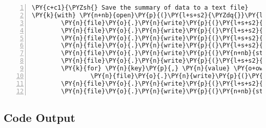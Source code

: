 \documentclass[12pt]{article}
\begin{document}
\begin{Verbatim}[commandchars=\\\{\},numbers=left,firstnumber=1,stepnumber=1,formatcom=\footnotesize]
\PY{c+c1}{\PYZsh{} Save the summary of data to a text file}
\PY{k}{with} \PY{n+nb}{open}\PY{p}{(}\PY{l+s+s2}{\PYZdq{}}\PY{l+s+s2}{data\PYZus{}exploration.txt}\PY{l+s+s2}{\PYZdq{}}\PY{p}{,} \PY{l+s+s2}{\PYZdq{}}\PY{l+s+s2}{w}\PY{l+s+s2}{\PYZdq{}}\PY{p}{)} \PY{k}{as} \PY{n}{file}\PY{p}{:}
        \PY{n}{file}\PY{o}{.}\PY{n}{write}\PY{p}{(}\PY{l+s+s2}{\PYZdq{}}\PY{l+s+s2}{Summary of Data}\PY{l+s+se}{\PYZbs{}n}\PY{l+s+s2}{\PYZdq{}}\PY{p}{)}
        \PY{n}{file}\PY{o}{.}\PY{n}{write}\PY{p}{(}\PY{l+s+s2}{\PYZdq{}}\PY{l+s+s2}{Number of rows: }\PY{l+s+s2}{\PYZdq{}} \PY{o}{+} \PY{n+nb}{str}\PY{p}{(}\PY{n}{num\PYZus{}rows}\PY{p}{)} \PY{o}{+} \PY{l+s+s2}{\PYZdq{}}\PY{l+s+se}{\PYZbs{}n}\PY{l+s+s2}{\PYZdq{}}\PY{p}{)}
        \PY{n}{file}\PY{o}{.}\PY{n}{write}\PY{p}{(}\PY{l+s+s2}{\PYZdq{}}\PY{l+s+s2}{Number of columns: }\PY{l+s+s2}{\PYZdq{}} \PY{o}{+} \PY{n+nb}{str}\PY{p}{(}\PY{n}{num\PYZus{}cols}\PY{p}{)} \PY{o}{+} \PY{l+s+s2}{\PYZdq{}}\PY{l+s+se}{\PYZbs{}n}\PY{l+s+s2}{\PYZdq{}}\PY{p}{)}
        \PY{n}{file}\PY{o}{.}\PY{n}{write}\PY{p}{(}\PY{l+s+s2}{\PYZdq{}}\PY{l+s+se}{\PYZbs{}n}\PY{l+s+s2}{Summary statistics of key variables:}\PY{l+s+se}{\PYZbs{}n}\PY{l+s+s2}{\PYZdq{}}\PY{p}{)}
        \PY{n}{file}\PY{o}{.}\PY{n}{write}\PY{p}{(}\PY{n+nb}{str}\PY{p}{(}\PY{n}{key\PYZus{}vars\PYZus{}summary}\PY{p}{)} \PY{o}{+} \PY{l+s+s2}{\PYZdq{}}\PY{l+s+se}{\PYZbs{}n}\PY{l+s+s2}{\PYZdq{}}\PY{p}{)}
        \PY{n}{file}\PY{o}{.}\PY{n}{write}\PY{p}{(}\PY{l+s+s2}{\PYZdq{}}\PY{l+s+se}{\PYZbs{}n}\PY{l+s+s2}{Most common values of categorical variables:}\PY{l+s+se}{\PYZbs{}n}\PY{l+s+s2}{\PYZdq{}}\PY{p}{)}
        \PY{k}{for} \PY{n}{key}\PY{p}{,} \PY{n}{value} \PY{o+ow}{in} \PY{n}{common\PYZus{}vars}\PY{o}{.}\PY{n}{items}\PY{p}{(}\PY{p}{)}\PY{p}{:}
                \PY{n}{file}\PY{o}{.}\PY{n}{write}\PY{p}{(}\PY{l+s+sa}{f}\PY{l+s+s2}{\PYZdq{}}\PY{l+s+si}{\PYZob{}}\PY{n}{key}\PY{l+s+si}{\PYZcb{}}\PY{l+s+s2}{: }\PY{l+s+si}{\PYZob{}}\PY{n}{value}\PY{l+s+si}{\PYZcb{}}\PY{l+s+se}{\PYZbs{}n}\PY{l+s+s2}{\PYZdq{}}\PY{p}{)}
        \PY{n}{file}\PY{o}{.}\PY{n}{write}\PY{p}{(}\PY{l+s+s2}{\PYZdq{}}\PY{l+s+se}{\PYZbs{}n}\PY{l+s+s2}{Number of missing values:}\PY{l+s+se}{\PYZbs{}n}\PY{l+s+s2}{\PYZdq{}}\PY{p}{)}
        \PY{n}{file}\PY{o}{.}\PY{n}{write}\PY{p}{(}\PY{n+nb}{str}\PY{p}{(}\PY{n}{missing\PYZus{}values}\PY{p}{)} \PY{o}{+} \PY{l+s+s2}{\PYZdq{}}\PY{l+s+se}{\PYZbs{}n}\PY{l+s+s2}{\PYZdq{}}\PY{p}{)}
\end{Verbatim}


\subsection{Code Output}
\end{document}
